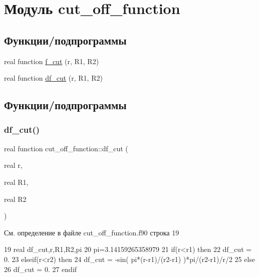\hypertarget{namespacecut__off__function}{}\section{Модуль cut\+\_\+off\+\_\+function}
\label{namespacecut__off__function}
\subsection*{Функции/подпрограммы}
\begin{DoxyCompactItemize}
\item 
real function \mbox{\hyperlink{namespacecut__off__function_acbf245e7d7bceb779e0510765042488b}{f\+\_\+cut}} (r, R1, R2)
\item 
real function \mbox{\hyperlink{namespacecut__off__function_af45796458c2774f2b3b30c3592efcae5}{df\+\_\+cut}} (r, R1, R2)
\end{DoxyCompactItemize}


\subsection{Функции/подпрограммы}
\mbox{\label{namespacecut__off__function_af45796458c2774f2b3b30c3592efcae5}} 
\subsubsection{\texorpdfstring{df\+\_\+cut()}{df\_cut()}}
{\footnotesize\ttfamily real function cut\+\_\+off\+\_\+function\+::df\+\_\+cut (\begin{DoxyParamCaption}\item[{real}]{r,  }\item[{real}]{R1,  }\item[{real}]{R2 }\end{DoxyParamCaption})}



См. определение в файле cut\+\_\+off\+\_\+function.\+f90 строка 19


\begin{DoxyCode}
19     \textcolor{keywordtype}{real} df\_cut,r,R1,R2,pi
20     pi=3.14159265358979
21     \textcolor{keywordflow}{if}(r<r1) \textcolor{keywordflow}{then}
22         df\_cut = 0.
23     \textcolor{keywordflow}{elseif}(r<r2) \textcolor{keywordflow}{then}
24         df\_cut = -sin( pi*(r-r1)/(r2-r1) )*pi/(r2-r1)/r/2
25     \textcolor{keywordflow}{else}
26         df\_cut = 0.
27 \textcolor{keywordflow}{    endif}   
\end{DoxyCode}
\mbox{\label{namespacecut__off__function_acbf245e7d7bceb779e0510765042488b}} 
